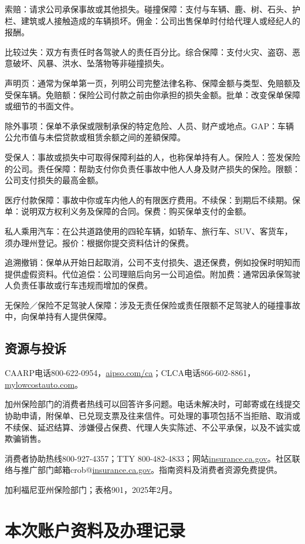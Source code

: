\documentclass[UTF8,fontset=none,11pt,a4paper]{ctexart}
\begin{document}
索赔：请求公司承保事故或其他损失。碰撞保障：支付与车辆、鹿、树、石头、护栏、建筑或人接触造成的车辆损坏。佣金：公司出售保单时付给代理人或经纪人的报酬。


比较过失：双方有责任时各驾驶人的责任百分比。综合保障：支付火灾、盗窃、恶意破坏、风暴、洪水、坠落物等非碰撞损失。


声明页：通常为保单第一页，列明公司完整法律名称、保障金额与类型、免赔额及受保车辆。免赔额：保险公司付款之前由你承担的损失金额。批单：改变保单保障或细节的书面文件。


除外事项：保单不承保或限制承保的特定危险、人员、财产或地点。GAP：车辆公允市值与未偿贷款或租赁余额之间的差額保障。


受保人：事故或损失中可取得保障利益的人，也称保单持有人。保险人：签发保险的公司。责任保障：帮助支付你负责任事故中他人人身及财产损失的保险。限额：公司支付损失的最高金额。


医疗付款保障：事故中你或车内他人的有限医疗费用。不续保：到期后不续期。保单：说明双方权利义务及保障的合同。保费：购买保单支付的金额。


私人乘用汽车：在公共道路使用的四轮车辆，如轿车、旅行车、SUV、客货车，须办理州登记。报价：根据你提交资料估计的保费。


追溯撤销：保单从开始日起取消，公司不支付损失、退还保费，例如投保时明知而提供虚假资料。代位追偿：公司理赔后向另一公司追偿。附加费：通常因承保驾驶人负责任事故或行车违规而增加的保费。


无保险／保险不足驾驶人保障：涉及无责任保险或责任限额不足驾驶人的碰撞事故中，向保单持有人提供保障。


\subsection*{资源与投诉}
CAARP电话800-622-0954，\url{aipso.com/ca}；CLCA电话866-602-8861，\url{mylowcostauto.com}。


加州保险部门的消费者热线可以回答许多问题。电话未解决时，可邮寄或在线提交协助申请，附保单、已兑现支票及往来信件。可处理的事项包括不当拒赔、取消或不续保、延迟结算、涉嫌侵占保费、代理人失实陈述、不公平承保，以及不诚实或欺骗销售。


消费者协助热线800-927-4357；TTY 800-482-4833；网站\url{insurance.ca.gov}。社区联络与推广部门邮箱crob@\url{insurance.ca.gov}。指南资料及消费者资源免费提供。


加利福尼亚州保险部门；表格901，2025年2月。


\section*{本次账户资料及办理记录}
\end{document}

